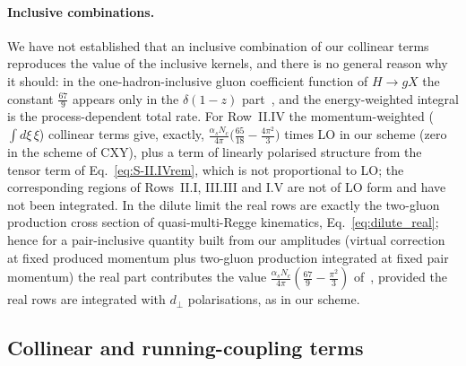 \paragraph{Inclusive combinations.} We have not established that an inclusive combination of our collinear terms reproduces the value of the inclusive kernels, and there is no general reason why it should: in the one-hadron-inclusive gluon coefficient function of $H\to gX$ the constant $\frac{67}{9}$ appears only in the $\delta(1-z)$ part~\cite{Almasy:2011eq}, and the energy-weighted integral is the process-dependent total rate. For Row~II.IV the momentum-weighted ($\int d\xi\,\xi$) collinear terms give, exactly, $\frac{\alpha_sN_c}{4\pi}\big(\frac{65}{18}-\frac{4\pi^2}{3}\big)$ times LO in our scheme (zero in the scheme of CXY), plus a term of linearly polarised structure from the tensor term of Eq.~\eqref{eq:S-II.IVrem}, which is not proportional to LO; the corresponding regions of Rows~II.I, III.III and I.V are not of LO form and have not been integrated. In the dilute limit the real rows are exactly the two-gluon production cross section of quasi-multi-Regge kinematics, Eq.~\eqref{eq:dilute_real}; hence for a pair-inclusive quantity built from our amplitudes (virtual correction at fixed produced momentum plus two-gluon production integrated at fixed pair momentum) the real part contributes the value $\frac{\alpha_sN_c}{4\pi}(\frac{67}{9}-\frac{\pi^2}{3})$ of~\cite{Fadin:1998py}, provided the real rows are integrated with $d_\perp$ polarisations, as in our scheme.

\subsection{Collinear and running-coupling terms}\label{sec:lit_dglap}

